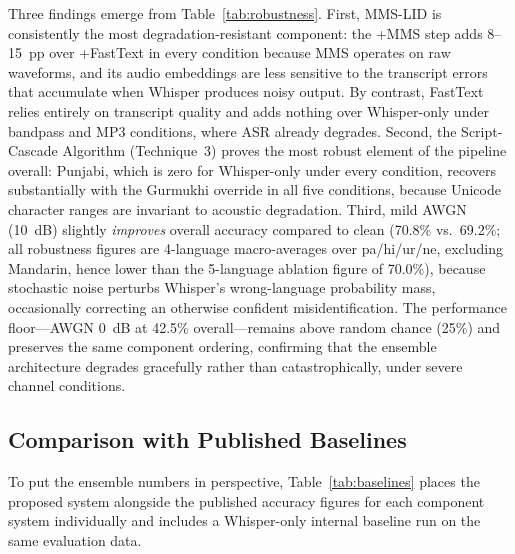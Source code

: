 \documentclass[12pt, onecolumn]{IEEEtran}
\begin{document}
Three findings emerge from Table~\ref{tab:robustness}. First, MMS-LID is consistently the most degradation-resistant component: the +MMS step adds 8--15~pp over +FastText in every condition because MMS operates on raw waveforms, and its audio embeddings are less sensitive to the transcript errors that accumulate when Whisper produces noisy output. By contrast, FastText relies entirely on transcript quality and adds nothing over Whisper-only under bandpass and MP3 conditions, where ASR already degrades. Second, the Script-Cascade Algorithm (Technique~3) proves the most robust element of the pipeline overall: Punjabi, which is zero for Whisper-only under every condition, recovers substantially with the Gurmukhi override in all five conditions, because Unicode character ranges are invariant to acoustic degradation. Third, mild AWGN (10~dB) slightly \textit{improves} overall accuracy compared to clean (70.8\% vs.\ 69.2\%; all robustness figures are 4-language macro-averages over pa/hi/ur/ne, excluding Mandarin, hence lower than the 5-language ablation figure of 70.0\%), because stochastic noise perturbs Whisper's wrong-language probability mass, occasionally correcting an otherwise confident misidentification. The performance floor---AWGN 0~dB at 42.5\% overall---remains above random chance (25\%) and preserves the same component ordering, confirming that the ensemble architecture degrades gracefully rather than catastrophically, under severe channel conditions.

\subsection{Comparison with Published Baselines}

To put the ensemble numbers in perspective, Table~\ref{tab:baselines} places the proposed system alongside the published accuracy figures for each component system individually and includes a Whisper-only internal baseline run on the same evaluation data.
\end{document}
